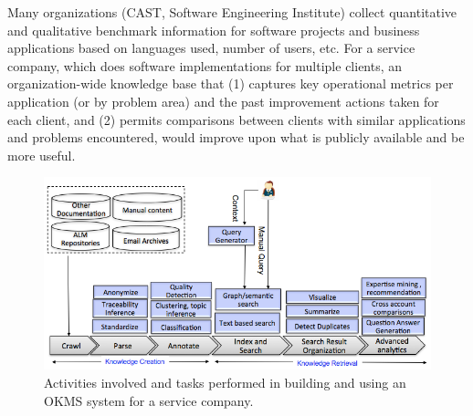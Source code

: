 Many organizations (\eg CAST, Software Engineering Institute) collect
quantitative and qualitative benchmark information for software projects and
business applications based on languages used, number of users, etc.  For a
service company, which does software implementations for multiple clients, an
organization-wide knowledge base that (1) captures key operational metrics per
application (or by problem area) and the past improvement actions taken for each
client, and (2) permits comparisons between clients with similar applications
and problems encountered, would improve upon what is publicly available and be
more useful.


\begin{figure}[t]
	\center \includegraphics[width=\columnwidth]{figs/km.png}
        \vspace*{-18pt}
	\caption{Activities involved and tasks performed in building and using
          an OKMS system for a service company.}
        \vspace*{-10pt}
	\label{fig-km}
\end{figure}

